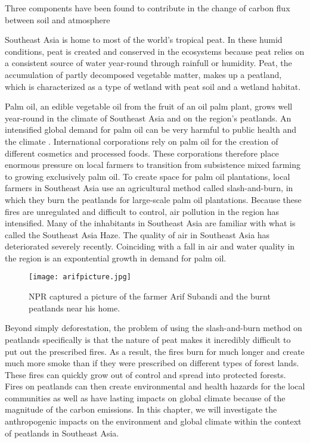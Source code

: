 Three components have been found to contribute in the change of carbon flux between soil and atmosphere




Southeast Asia is home to most of the world's tropical peat. In these humid conditions, peat is created and conserved in the ecosystems because peat relies on a consistent source of water year-round through rainfull or humidity. Peat, the accumulation of partly decomposed vegetable matter, makes up a peatland, which is characterized as a type of wetland with peat soil and a wetland habitat. 

Palm oil, an edible vegetable oil from the fruit of an oil palm plant, grows well year-round in the climate of Southeast Asia and on the region's peatlands. An intensified global demand for palm oil can be very harmful to public health and the climate \citep{knitr2013}. International corporations rely on palm oil for the creation of different cosmetics and processed foods. These corporations therefore place enormous pressure on local farmers to transition from subsistence mixed farming to growing exclusively palm oil. To create space for palm oil plantations, local farmers in Southeast Asia use an agricultural method called slash-and-burn, in which they burn the peatlands for large-scale palm oil plantations. Because these fires are unregulated and difficult to control, air pollution in the region has intensified. Many of the inhabitants in Southeast Asia are familiar with what is called the Southeast Asia Haze. The quality of air in Southeast Asia has deteriorated severely recently. Coinciding with a fall in air and water quality in the region is an expontential growth in demand for palm oil. 

\begin{figure}
  \texttt{[image: arifpicture.jpg]}
  \caption{NPR captured a picture of the farmer Arif Subandi and the burnt peatlands near his home.}
  \label{fig:arifpicture}
\end{figure}

Beyond simply deforestation, the problem of using the slash-and-burn method on peatlands specifically is that the nature of peat makes it incredibly difficult to put out the prescribed fires. As a result, the fires burn for much longer and create much more smoke than if they were prescribed on different types of forest lands. These fires can quickly grow out of control and spread into protected forests. Fires on peatlands can then create environmental and health hazards for the local communities as well as have lasting impacts on global climate because of the magnitude of the carbon emissions. In this chapter, we will investigate the anthropogenic impacts on the environment and global climate within the context of peatlands in Southeast Asia. 

